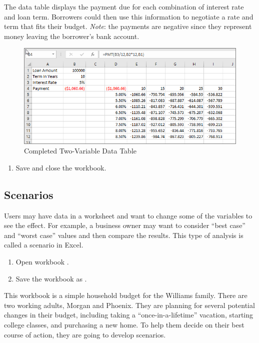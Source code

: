 The data table displays the payment due for each combination of interest rate and loan term. Borrowers could then use this information to negotiate a rate and term that fits their budget. \textit{Note}: the payments are negative since they represent money leaving the borrower's bank account.

\begin{figure}[H]
	\centering
	\includegraphics[width=\maxwidth{.95\linewidth}]{gfx/ch08_fig45}
	\caption{Completed Two-Variable Data Table}
	\label{08:fig45}
\end{figure}

\begin{enumerate}[resume]
	\item Save and close the  workbook.
\end{enumerate}

\subsection{Scenarios}

Users may have data in a worksheet and want to change some of the variables to see the effect. For example, a business owner may want to consider ``best case'' and ``worst case'' values and then compare the results. This type of analysis is called a scenario in Excel.

\begin{enumerate}
	\item Open workbook .
	\item Save the workbook as .
\end{enumerate}

This workbook is a simple household budget for the Williams family. There are two working adults, Morgan and Phoenix. They are planning for several potential changes in their budget, including taking a ``once-in-a-lifetime'' vacation, starting college classes, and purchasing a new home. To help them decide on their best course of action, they are going to develop scenarios.

